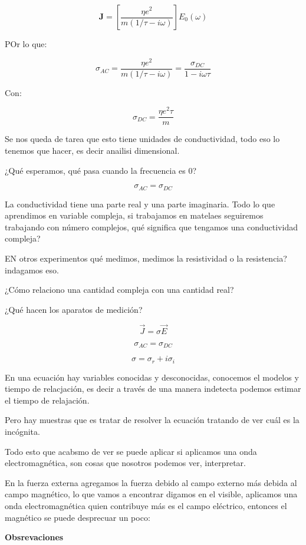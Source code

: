\documentclass{article}
\begin{document}
\[  \boldsymbol{J} = \left[  \frac{ \eta e^{2} }{ m(1/\tau - i\omega)   }  \right] E_{0}(\omega)  \]


POr lo que:

\[   \sigma_{AC} = \frac{ \eta e^{2} }{ m(1/\tau - i\omega) } = \frac{ \sigma_{DC} }{1-i\omega\tau}     \]

Con:

\[ \boxed{  \sigma_{DC} = \frac{ \eta e^{2}\tau }{m} } \]


Se nos queda de tarea que esto tiene unidades de conductividad, todo eso lo tenemos que hacer, es decir anailisi dimensional.

¿Qué esperamos, qué pasa cuando la frecuencia es 0?

\[ \sigma_{AC} = \sigma_{DC} \]

La conductividad tiene una parte real y una parte imaginaria. Todo lo que aprendimos en variable compleja, si trabajamos en matelaes seguiremos trabajando con número complejos, qué significa que tengamos una conductividad compleja?

EN otros experimentos qué medimos, medimos la resistividad o la resistencia? indagamos eso.

¿Cómo relaciono una cantidad compleja con una cantidad real? 

¿Qué hacen los aparatos de medición?

\[ \boxed{\vec{J} = \sigma \vec{E}} \]



\[ \sigma_{AC} = \sigma_{DC}\]

\[ \sigma = \sigma_{r} + i \sigma_{i}   \]


En una ecuación hay variables conocidas y desconocidas, conocemos el modelos y tiempo de relacjación, es decir a través de una manera indetecta podemos estimar el tiempo de relajación.

Pero hay muestras que es tratar de resolver la ecuación tratando de ver cuál es la incógnita. 

Todo esto que acabsmo de ver se puede aplicar si aplicamos una onda electromagnética, son cosas que nosotros podemos ver, interpretar.


En la fuerza externa agregamos la fuerza debido al campo externo más debida al campo magnético, lo que vamos a encontrar digamos en el visible, aplicamos una onda electromagnética quien contribuye más es el campo eléctrico, entonces el magnético se puede desprecuar un poco:

\textcolor{orange(colorwheel)}{\textbf{Obsrevaciones}}
\end{document}
